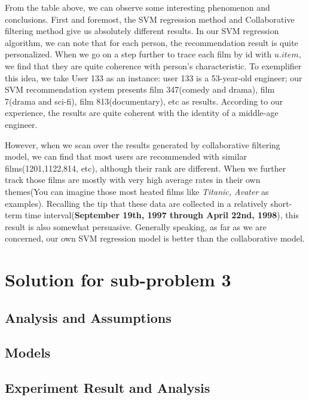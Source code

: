 From the table above, we can observe some interesting phenomenon and conclusions. First and foremost, the SVM regression method and Collaborative filtering method give us absolutely different results. In our SVM regression algorithm, we can note that for each person, the recommendation result is quite personalized. When we go on a step further to trace each film by id with $u.item$, we find that they are quite coherence with person's characteristic. To exemplifier this idea, we take User 133 as an instance: user 133 is a 53-year-old engineer; our SVM recommendation system presents film 347(comedy and drama), film 7(drama and sci-fi), film 813(documentary), etc as results. According to our experience, the results are quite coherent with the identity of a middle-age engineer. 

However, when we scan over the results generated by collaborative filtering model, we can find that most users are recommended with similar films(1201,1122,814, etc), although their rank are different. When we further track those films are mostly with very high average rates in their own themes(You can imagine those most heated films like \textit{Titanic, Avater} as examples). Recalling the tip that these data are collected in a relatively short-term time interval(\textbf{September 19th, 1997 through April 22nd, 1998}), this result is also somewhat persuasive. Generally speaking, as far as we are concerned, our own SVM regression model is better than the collaborative model. 

\section{Solution for sub-problem 3}
\subsection{Analysis and Assumptions}
\subsection{Models}
\subsection{Experiment Result and Analysis}


